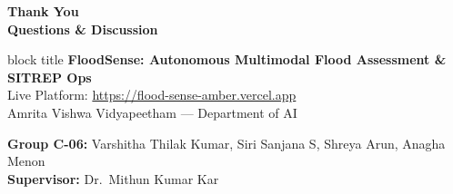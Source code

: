 \documentclass[aspectratio=169, 10pt, professionalfonts]{beamer}
\begin{document}
\begin{frame}[plain]
  \begin{center}
    \vspace{2.0em}
    {\Huge \textbf{\textcolor{NavyDark}{Thank You}}}\\[1.0em]
    {\large \textbf{Questions \& Discussion}}\\[2.0em]
    
    \begin{beamercolorbox}[wd=0.75\textwidth,rounded=true,shadow=true,center,sep=1em]{block title}
      \textbf{FloodSense: Autonomous Multimodal Flood Assessment \& SITREP Ops}\\[0.4em]
      \small Live Platform: \url{https://flood-sense-amber.vercel.app}\\[0.2em]
      Amrita Vishwa Vidyapeetham --- Department of AI
    \end{beamercolorbox}
    
    \vspace{1.5em}
    {\footnotesize \textbf{Group C-06:} Varshitha Thilak Kumar, Siri Sanjana S, Shreya Arun, Anagha Menon\\
    \textbf{Supervisor:} Dr.~Mithun Kumar Kar}
  \end{center}
\end{frame}
\end{document}
